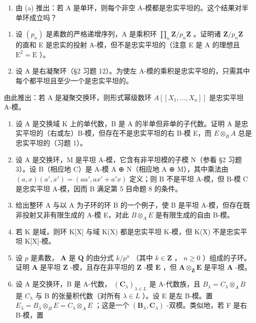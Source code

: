 \begin{enumerate}
\def\labelenumi{(\alph{enumi})}
\setcounter{enumi}{1}
\tightlist
\item
由 (a) 推出：若 A 是单环，则每个非空 A-模都是忠实平坦的。这个结果对半单环成立吗？
\end{enumerate}

\begin{enumerate}
\def\labelenumi{\arabic{enumi}.}
\setcounter{enumi}{1}
\item
设 \((p_n)\) 是素数的严格递增序列，A 是乘积环 \(\prod_{n} \mathbf{Z} / p_n \mathbf{Z}\) 。证明诸 \(\mathbf{Z} / p_n \mathbf{Z}\) 的直和 E 是忠实的投射 A-模，但不是忠实平坦的（注意 E 是 A 的理想且 \(\mathrm{E}^2 = \mathrm{E}\) ）。
\item
设 A 是右凝聚环（§2 习题 12）。为使左 A-模的乘积是忠实平坦的，只需其中每个都平坦且至少一个是忠实平坦的。
\end{enumerate}

由此推出：若 A 是凝聚交换环，则形式幂级数环 \(A[[X_{1},\ldots,X_{n}]]\) 是忠实平坦 A-模。

\begin{enumerate}
\def\labelenumi{\arabic{enumi}.}
\setcounter{enumi}{3}
\item
设 A 是交换域 K 上的单代数，B 是 A 的半单但非单的子代数。证明 A 是忠实平坦的（右或左）B-模，但存在不是忠实平坦的右 B-模 E，而 \(E \otimes_{B} A\) 总是忠实平坦的（习题 1）。
\item
设 A 是交换环，M 是平坦 A-模，它含有非平坦模的子模 N（参看 §2 习题 3）。设 B（相应地 C）是 A-模 A ⊕ N（相应地 A ⊕ M），其中乘法由 \((a, x)(a', x') = (aa', ax' + a'x)\) 定义；则 B 不是平坦 A-模，但 B-模 C 是忠实平坦 A-模，因而 B 满足第 5 目命题 8 的条件。
\item
给出整环 A 与以 A 为子环的环 B 的一个例子，使 B 是平坦 A-模，但存在既非投射又非有限生成的 A-模 E，对此 \(B \otimes_{A} E\) 是有限生成的自由 B-模。
\item
若 K 是域，则环 K{[}X{]} 与域 K(X) 都是忠实平坦 K-模，但 K(X) 不是忠实平坦 K{[}X{]}-模。
\item
设 \(p\) 是素数， \(\mathbf{A}\) 是 \(\mathbf{Q}\) 的由分式 \(k / p^n\) （其中 \(k \in \mathbf{Z}\) ， \(n \geqslant 0\) ）组成的子环。证明 \(\mathbf{A}\) 是平坦 \(\mathbf{Z}\) -模，且存在非平坦的 \(\mathbf{Z}\) -模 \(\mathbf{E}\) ，但 \(\mathbf{A} \otimes_{\mathbf{Z}} \mathbf{E}\) 是平坦 \(\mathbf{A}\) -模。
\item
设 A 是交换环，B 是 A-代数， \((\mathbf{C}_{\lambda})_{\lambda \in L}\) 是 A-代数族，且 \(B_{\lambda} = C_{\lambda} \otimes_{A} B\) 是 \(C_{\lambda}\) 与 B 的张量积代数（对所有 \(\lambda \in L\) ）。设 E 是左 B-模。置 \(E_{\lambda} = B_{\lambda} \otimes_{B} E = C_{\lambda} \otimes_{A} E\) ；这是一个 \((\mathbf{B}_{\lambda}, \mathbf{C}_{\lambda})\) -双模。类似地，若 F 是右 B-模，置
\end{enumerate}

